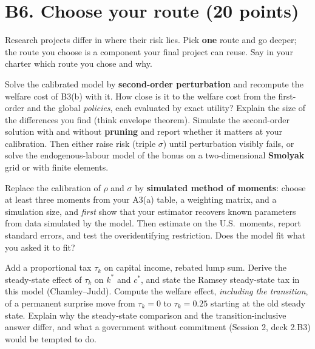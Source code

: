 \documentclass[11pt]{article}
\newif\ifsolutions \solutionsfalse
\newcommand{\solution}[1]{\ifsolutions\medskip
  {\color{blue!45!black}\textbf{Solution.} #1}\medskip\fi}
\begin{document}
\solution{\keyBten}

\section*{B6. Choose your route (20 points)}

Research projects differ in where their risk lies. Pick \textbf{one} route and go deeper; the route
you choose is a component your final project can reuse. Say in your charter which route you chose
and why.

\begin{description}[leftmargin=*, style=nextline]
\item[R1. The numerical frontier (Sessions 4--5).] Solve the calibrated model by
\textbf{second-order perturbation} and recompute the welfare cost of B3(b) with it. How close is it
to the welfare cost from the first-order and the global \emph{policies}, each evaluated by exact
utility? Explain the size of the differences you find (think envelope theorem). Simulate the second-order
solution with and without \textbf{pruning} and report whether it matters at your calibration. Then
either raise risk (triple $\sigma$) until perturbation visibly fails, or solve the endogenous-labour
model of the bonus on a two-dimensional \textbf{Smolyak} grid or with finite elements.
\item[R2. Data and estimation (Sessions 3--4).] Replace the calibration of $\rho$ and $\sigma$ by
\textbf{simulated method of moments}: choose at least three moments from your A3(a) table, a
weighting matrix, and a simulation size, and \emph{first} show that your estimator recovers known
parameters from data simulated by the model. Then estimate on the U.S.\ moments, report standard
errors, and test the overidentifying restriction. Does the model fit what you asked it to fit?
\item[R3. Policy (Session 2).] Add a proportional tax $\tau_k$ on capital income, rebated lump
sum. Derive the steady-state effect of $\tau_k$ on $k^*$ and $c^*$, and state the Ramsey
steady-state tax in this model (Chamley--Judd). Compute the welfare effect, \emph{including the
transition}, of a permanent surprise move from $\tau_k=0$ to $\tau_k=0.25$ starting at the old
steady state. Explain why the steady-state comparison and the transition-inclusive answer differ,
and what a government without commitment (Session 2, deck 2.B3) would be tempted to do.
\end{description}
\end{document}
